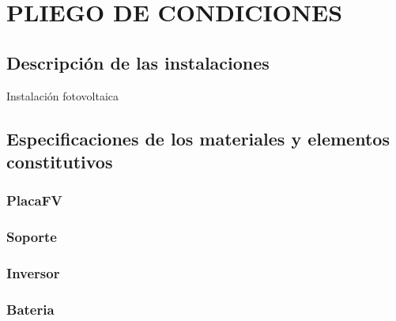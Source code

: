 \documentclass{article}
\begin{document}
\chapter{ PLIEGO DE CONDICIONES}
\section{ Descripción de las instalaciones}
Instalación fotovoltaica


\section{ Especificaciones de los materiales y elementos constitutivos}


\subsection{PlacaFV}
\PlacaFV

\subsection{Soporte}
\Soporte

\subsection{Inversor}
\Inversor

\subsection{Bateria}
\Bateria
\end{document}
